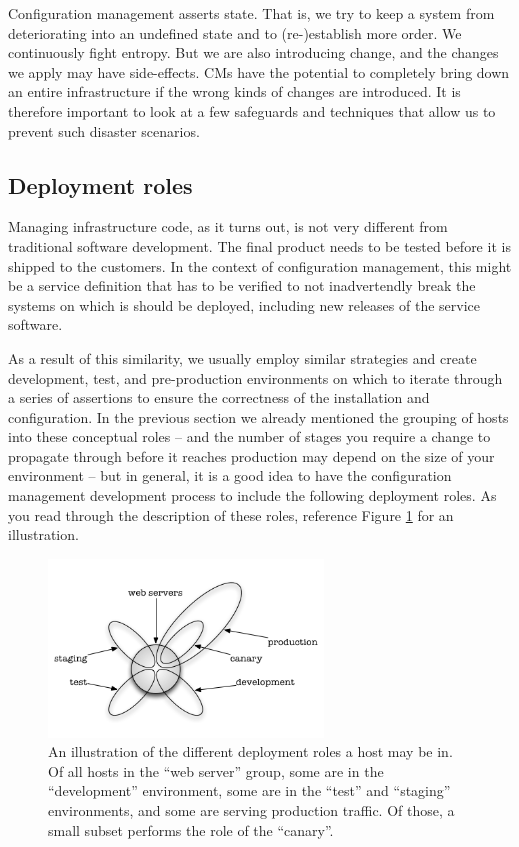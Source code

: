 Configuration management asserts state.  That is, we
try to keep a system from deteriorating into an
undefined state and to (re-)establish more order.  We
continuously fight entropy.  But we are also
introducing change, and the changes we apply may have
side-effects.  CMs have the potential to completely
bring down an entire infrastructure if the wrong kinds
of changes are introduced.  It is therefore important
to look at a few safeguards and techniques that allow
us to prevent such disaster scenarios.

\subsection{Deployment roles}
\label{configuration-management:fighting-entropy:deployment-roles}

Managing infrastructure code, as it turns out, is not
very different from traditional software development.
The final product needs to be tested before it is
shipped to the customers.  In the context of
configuration management, this might be a service
definition that has to be verified to not
inadvertendly break the systems on which is should be
deployed, including new releases of the service
software.

As a result of this similarity, we usually employ
similar strategies and create development, test, and
pre-production environments on which to iterate
through a series of assertions to ensure the
correctness of the installation and configuration.  In
the previous section we already mentioned the grouping
of hosts into these conceptual roles -- and the number
of stages you require a change to propagate through
before it reaches production may depend on the size of
your environment -- but in general, it is a good idea
to have the configuration management development
process to include the following deployment roles.  As
you read through the description of these roles,
reference Figure
\ref{fig:configuration-management:host-sets} for an
illustration.

\begin{figure}[!t]
	\centering
	\includegraphics[width=0.65\textwidth]{07/pics/host-sets}
		\caption[Host Deployment Roles as Sets]{An illustration of
			the different deployment roles a host may be in.
			Of all hosts in the ``web server'' group, some are
			in the ``development'' environment, some are in the
			``test'' and ``staging'' environments, and some
			are serving production traffic.  Of those, a small
			subset performs the role of the ``canary''.
			\label{fig:configuration-management:host-sets}}
\end{figure}

